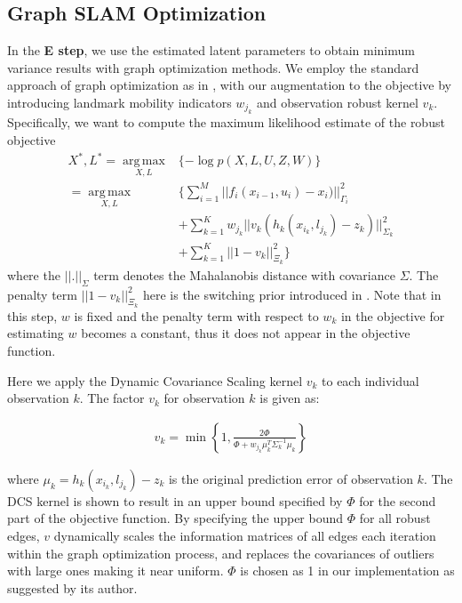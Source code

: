 \subsection{Graph SLAM Optimization}

In the \textbf{E step}, we use the estimated latent parameters to obtain minimum variance results with graph optimization methods. We employ the standard approach of graph optimization as in \cite{g2o}, with our augmentation to the objective by introducing landmark mobility indicators $w_{j_k}$ and observation robust kernel $v_k$. Specifically, we want to compute the maximum likelihood estimate of the robust objective
\begin{equation}
\begin{aligned}
X^*, L^* = \operatorname*{arg\,max}_{X, L} & \{ -\log p(X, L, U, Z, W) \}\\
=\operatorname*{arg\,max}_{X, L} & \{ \sum_{i=1}^M||f_i(x_{i-1}, u_i) - x_i)||^2_{\Gamma_i} \\
&+ \sum_{k=1}^K w_{j_k}|| v_k (h_k(x_{i_k}, l_{j_k}) - z_k)||^2_{\Sigma_k} \\ 
&+ \sum_{k=1}^K ||1 - v_k||^2_{\Xi_k} \}
\end{aligned}
\label{eq:MAP}
\end{equation}
where the $||.||_\Sigma$ term denotes the Mahalanobis distance with covariance $\Sigma$. The penalty term $|| 1 - v_k||^2_{\Xi_k}$ here is the switching prior introduced in \cite{Switchable12}. Note that in this step, $w$ is fixed and the penalty term with respect to $w_k$ in the objective for estimating $w$ becomes a constant, thus it does not appear in the objective function.

Here we apply the Dynamic Covariance Scaling\cite{DCS} kernel $v_k$ to each individual observation $k$. The factor $v_k$ for observation $k$ is given as:

\begin{equation}
\begin{aligned}
v_k = \min \left\{ 1, \frac{2\Phi}{\Phi + w_{j_k}\mu_k^T \Sigma_k^{-1} \mu_k}\right\}
\end{aligned}
\label{eq:DCS}
\end{equation}

where $\mu_k = h_k(x_{i_k}, l_{j_k}) - z_k$ is the original prediction error of observation $k$. The DCS kernel is shown to result in an upper bound specified by $\Phi$ for the second part of the objective function. By specifying the upper bound $\Phi$ for all robust edges, $v$ dynamically scales the information matrices of all edges each iteration within the graph optimization process, and replaces the covariances of outliers with large ones making it near uniform. $\Phi$ is chosen as 1 in our implementation as suggested by its author. 

